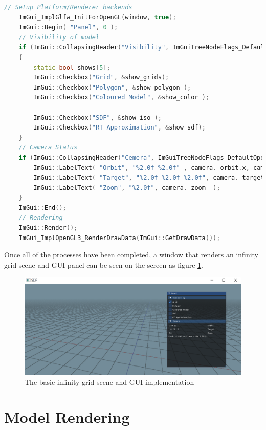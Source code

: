 \begin{lstlisting}[language=C++, label={lst:guimpl}, caption = ImGui panel implementation]
    // Setup Platform/Renderer backends
    ImGui_ImplGlfw_InitForOpenGL(window, true);
    ImGui::Begin( "Panel", 0 );
    // Visibility of model
    if (ImGui::CollapsingHeader("Visibility", ImGuiTreeNodeFlags_DefaultOpen ))
    {
        static bool shows[5];
        ImGui::Checkbox("Grid", &show_grids);
        ImGui::Checkbox("Polygon", &show_polygon );
        ImGui::Checkbox("Coloured Model", &show_color );

        ImGui::Checkbox("SDF", &show_iso );
        ImGui::Checkbox("RT Approximation", &show_sdf);
    }
    // Camera Status
    if (ImGui::CollapsingHeader("Cemera", ImGuiTreeNodeFlags_DefaultOpen)) {
        ImGui::LabelText( "Orbit", "%2.0f %2.0f" , camera._orbit.x, camera._orbit.y );
        ImGui::LabelText( "Target", "%2.0f %2.0f %2.0f", camera._target.x, camera._target.y ,camera._target.z );
        ImGui::LabelText( "Zoom", "%2.0f", camera._zoom  );
    }
    ImGui::End();
    // Rendering
    ImGui::Render();
    ImGui_ImplOpenGL3_RenderDrawData(ImGui::GetDrawData());
\end{lstlisting}

Once all of the processes have been completed, a window that renders an infinity grid scene and GUI panel can be seen on the screen as figure \ref{impl:gui}.

\begin{figure}[htbp]
    \centering
    \includegraphics[width=16cm]{Images/Chap4/GUI.png}
    \caption{The basic infinity grid scene and GUI implementation}
    \label{impl:gui}
\end{figure}

\clearpage

\section{Model Rendering}

